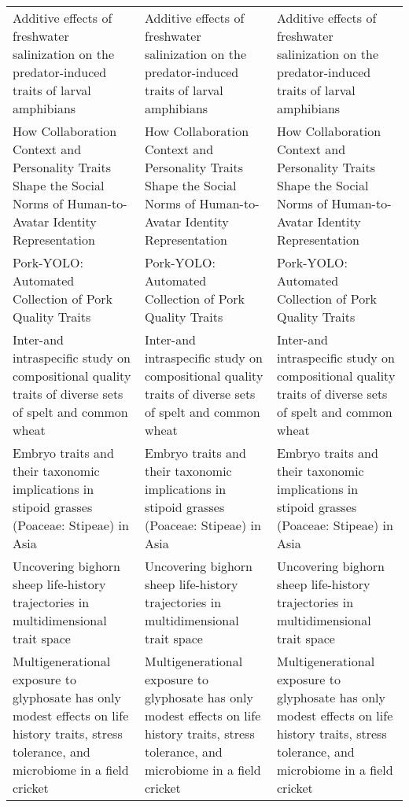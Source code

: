 \begin{table}[h!]
\begin{adjustbox}{width=1.2\textwidth,center}
\begin{tabularx}{\textwidth}{|X|X|X|}
        Additive effects of freshwater salinization on the predator-induced traits of larval amphibians & Additive effects of freshwater salinization on the predator-induced traits of larval amphibians & Additive effects of freshwater salinization on the predator-induced traits of larval amphibians\\
        How Collaboration Context and Personality Traits Shape the Social Norms of Human-to-Avatar Identity Representation & How Collaboration Context and Personality Traits Shape the Social Norms of Human-to-Avatar Identity Representation & How Collaboration Context and Personality Traits Shape the Social Norms of Human-to-Avatar Identity Representation\\
        Pork-YOLO: Automated Collection of Pork Quality Traits & Pork-YOLO: Automated Collection of Pork Quality Traits & Pork-YOLO: Automated Collection of Pork Quality Traits\\
        Inter-and intraspecific study on compositional quality traits of diverse sets of spelt and common wheat & Inter-and intraspecific study on compositional quality traits of diverse sets of spelt and common wheat & Inter-and intraspecific study on compositional quality traits of diverse sets of spelt and common wheat\\
        Embryo traits and their taxonomic implications in stipoid grasses (Poaceae: Stipeae) in Asia & Embryo traits and their taxonomic implications in stipoid grasses (Poaceae: Stipeae) in Asia & Embryo traits and their taxonomic implications in stipoid grasses (Poaceae: Stipeae) in Asia\\
        Uncovering bighorn sheep life-history trajectories in multidimensional trait space & Uncovering bighorn sheep life-history trajectories in multidimensional trait space & Uncovering bighorn sheep life-history trajectories in multidimensional trait space\\
        Multigenerational exposure to glyphosate has only modest effects on life history traits, stress tolerance, and microbiome in a field cricket & Multigenerational exposure to glyphosate has only modest effects on life history traits, stress tolerance, and microbiome in a field cricket & Multigenerational exposure to glyphosate has only modest effects on life history traits, stress tolerance, and microbiome in a field cricket\\
        \hline
    \end{tabularx}
\end{adjustbox}
    \label{table:llmTitel}
\end{table}
